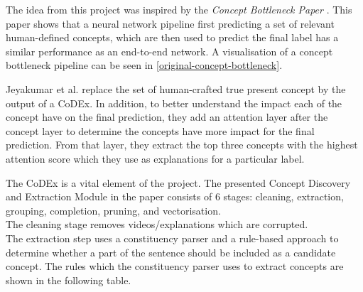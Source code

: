 The idea from this project was inspired by the \emph{Concept Bottleneck Paper} \cite{RefWorks:RefID:35-koh2020concept}.
This paper shows that a neural network pipeline first predicting a set of relevant human-defined concepts, which are then used to predict the final label has a similar performance as an end-to-end network. 
A visualisation of a concept bottleneck pipeline can be seen in \ref{original-concept-bottleneck}.

Jeyakumar et al. replace the set of human-crafted true present concept by the output of a CoDEx. 
In addition, to better understand the impact each of the concept have on the final prediction, they add an attention layer after the concept layer to determine the concepts have more impact for the final prediction.
From that layer, they extract the top three concepts with the highest attention score which they use as explanations for a particular label.


 
 
 

The CoDEx is a vital element of the project.
The presented Concept Discovery and Extraction Module in the paper consists of 6 stages: cleaning, extraction, grouping, completion, pruning, and vectorisation. \\
The cleaning stage removes videos/explanations which are corrupted. \\
The extraction step uses a constituency parser and a rule-based approach to determine whether a part of the sentence  should be included as a candidate concept. 
The rules which the constituency parser uses to extract concepts are shown in the following table.

